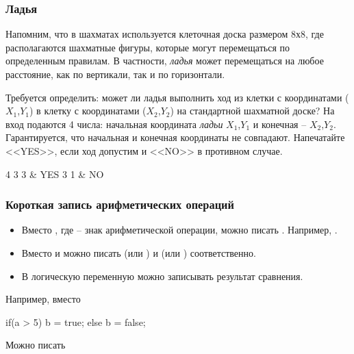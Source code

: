 \begin{frame}
	\frametitle{Ладья}
	Напомним, что в шахматах используется клеточная доска размером $8х8$, где
	располагаются шахматные фигуры, которые могут перемещаться по определенным
	правилам. В частности, {\it ладья} может перемещаться на любое расстояние, как по
	вертикали, так и по горизонтали.

	Требуется определить: может ли ладья выполнить ход из клетки с координатами
	($X_1$,$Y_1$) в клетку с координатами ($X_2$,$Y_2$) на стандартной шахматной доске?
	\inp
	На вход подаются 4 числа: начальная координата {\it ладьи} $X_1$,$Y_1$ и конечная
	-- $X_2$,$Y_2$. Гарантируется, что начальная и конечная координаты не совпадают.
	\out
	Напечатайте <<YES>>, если ход допустим и <<NO>> в противном случае.
	\begin{ex}
		4 3  3 & YES  3  1 & NO \tb
	\end{ex}
\end{frame}

\begin{frame}[fragile]
	\frametitle{Короткая запись арифметических операций}

	\begin{itemize}
		\item Вместо , где  -- знак арифметической операции,
	можно писать . Например, .
		\item Вместо  и  можно писать  (или
	) и  (или ) соответственно.
		\item В логическую переменную можно записывать результат сравнения.
	\end{itemize}
	Например, вместо
	\begin{code}
if(a > 5) b = true;
else b = false;
	\end{code}
	Можно писать \\
\end{frame}

